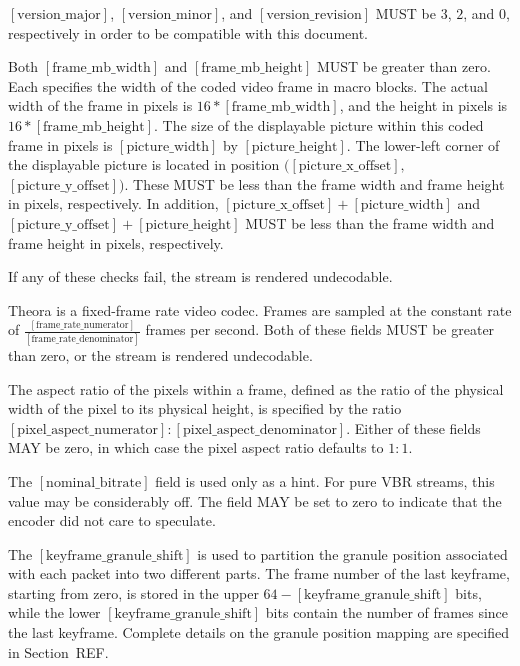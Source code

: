\documentclass[11pt,letterpaper]{article}
\newcommand{\qi}{\ensuremath{\mathit{qi}} }
\newcommand{\bitvar}[1]{\ensuremath{\left[\mathrm{#1}\right]}}
\begin{document}
\bitvar{version\_major}, \bitvar{version\_minor}, and
 \bitvar{version\_revision} MUST be $3$, $2$, and $0$, respectively in order
 to be compatible with this document.

Both \bitvar{frame\_mb\_width} and \bitvar{frame\_mb\_height} MUST be greater
 than zero.
Each specifies the width of the coded video frame in macro blocks.
The actual width of the frame in pixels is $16*\bitvar{frame\_mb\_width}$, and
 the height in pixels is $16*\bitvar{frame\_mb\_height}$.
The size of the displayable picture within this coded frame in pixels is
 \bitvar{picture\_width} by \bitvar{picture\_height}.
The lower-left corner of the displayable picture is located in position
 $(\bitvar{picture\_x\_offset},$ $\bitvar{picture\_y\_offset})$.
These MUST be less than the frame width and frame height in pixels,
 respectively.
In addition, $\bitvar{picture\_x\_offset}+\bitvar{picture\_width}$ and
 $\bitvar{picture\_y\_offset}+\bitvar{picture\_height}$ MUST be less than the
 frame width and frame height in pixels, respectively.

If any of these checks fail, the stream is rendered undecodable.

Theora is a fixed-frame rate video codec.
Frames are sampled at the constant rate of
 $\frac{\bitvar{frame\_rate\_numerator}}{\bitvar{frame\_rate\_denominator}}$
 frames per second.
Both of these fields MUST be greater than zero, or the stream is rendered
 undecodable.

The aspect ratio of the pixels within a frame, defined as the ratio of the
 physical width of the pixel to its physical height, is specified by the ratio
 $\bitvar{pixel\_aspect\_numerator}:\bitvar{pixel\_aspect\_denominator}$.
Either of these fields MAY be zero, in which case the pixel aspect ratio
 defaults to $1:1$.

The \bitvar{nominal\_bitrate} field is used only as a hint.
For pure VBR streams, this value may be considerably off.
The field MAY be set to zero to indicate that the encoder did not care to
 speculate.

The \bitvar{keyframe\_granule\_shift} is used to partition the granule
 position associated with each packet into two different parts.
The frame number of the last keyframe, starting from zero, is stored in the
 upper $64-\bitvar{keyframe\_granule\_shift}$ bits, while the lower
 \bitvar{keyframe\_granule\_shift} bits contain the number of frames since the
 last keyframe.
Complete details on the granule position mapping are specified in Section~REF.
\end{document}
